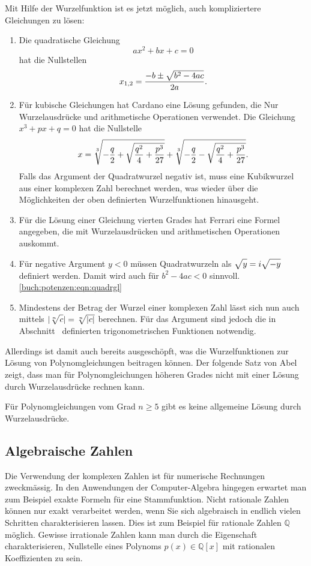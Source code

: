 Mit Hilfe der Wurzelfunktion ist es jetzt möglich, auch kompliziertere
Gleichungen zu lösen:
\begin{enumerate}
\item
Die quadratische Gleichung 
\[
ax^2+bx+c=0
\]
hat die Nullstellen
\begin{equation}
x_{1,2} = \frac{-b\pm\sqrt{b^2-4ac\mathstrut}}{2a}.
\label{buch:potenzen:eqn:quadrgl}
\end{equation}
\item
Für kubische Gleichungen hat Cardano eine Lösung gefunden, die
Nur Wurzelausdrücke und arithmetische Operationen verwendet.
Die Gleichung $x^3+px+q=0$ hat die Nullstelle
\[
x
=
\root{3}\of{-\frac{q}2+\sqrt{\frac{q^2}4+\frac{p^3}{27}}}
+
\root{3}\of{-\frac{q}2-\sqrt{\frac{q^2}4+\frac{p^3}{27}}}.
\]
Falls das Argument der Quadratwurzel negativ ist, muss eine
Kubikwurzel aus einer komplexen Zahl berechnet werden, was
wieder über die Möglichkeiten der oben definierten Wurzelfunktionen
hinausgeht.
\item
Für die Lösung einer Gleichung vierten Grades hat Ferrari eine
Formel angegeben, die mit Wurzelausdrücken und arithmetischen
Operationen auskommt.
\item
Für negative Argument $y<0$ müssen Quadratwurzeln als
$\sqrt{y\mathstrut}=i\sqrt{-y\mathstrut}$ definiert werden.
Damit wird auch für $b^2-4ac<0$ sinnvoll.
\eqref{buch:potenzen:eqn:quadrgl}
\item
Mindestens der Betrag der Wurzel einer komplexen Zahl lässt
sich nun auch mittels $|\root{n}\of{c\mathstrut}|=\root{n}\of{|c|\mathstrut}$
berechnen.
Für das Argument sind jedoch die in
Abschnitt~\label{buch:geometrie:section:trigonometrisch} definierten
trigonometrischen Funktionen notwendig.
\end{enumerate}

Allerdings ist damit auch bereits ausgeschöpft, was die
Wurzelfunktionen zur Lösung von Polynomgleichungen beitragen
können.
Der folgende Satz von Abel zeigt, dass man für Polynomgleichungen
höheren Grades nicht mit einer Lösung durch Wurzelausdrücke
rechnen kann.

\begin{satz}[Abel]
\label{buch:potenzen:satz:abel}
Für Polynomgleichungen vom Grad $n\ge 5$ gibt es keine allgemeine
Lösung durch Wurzelausdrücke.
\end{satz}



%
%
\subsection{Algebraische Zahlen}
Die Verwendung der komplexen Zahlen ist für numerische Rechnungen
zweckmässig.
In den Anwendungen der Computer-Algebra hingegen erwartet man zum
Beispiel exakte Formeln für eine Stammfunktion.
%
%
Nicht rationale Zahlen können nur exakt verarbeitet werden, wenn
Sie sich algebraisch in endlich vielen Schritten charakterisieren
lassen.
Dies ist zum Beispiel für rationale Zahlen $\mathbb{Q}$ möglich.
Gewisse irrationale Zahlen kann man durch die Eigenschaft charakterisieren,
Nullstelle eines Polynoms $p(x)\in\mathbb{Q}[x]$
mit rationalen Koeffizienten zu sein.

